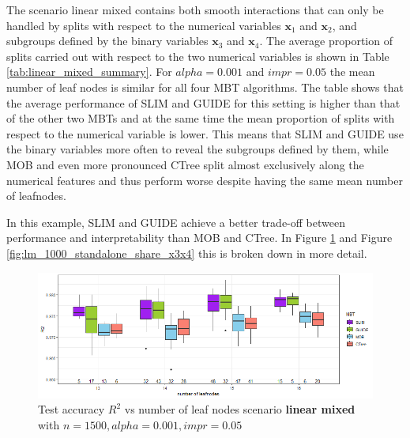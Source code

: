 The scenario linear mixed contains both smooth interactions that can only be handled by splits with respect to the numerical variables $\textbf{x}_1$ and $\textbf{x}_2$, and subgroups defined by the binary variables $\textbf{x}_3$ and $\textbf{x}_4$. 
The average proportion of splits carried out with respect to the two numerical variables is shown in Table \ref{tab:linear_mixed_summary}.
For $alpha = 0.001$ and $impr = 0.05$ the mean number of leaf nodes is similar for all four MBT algorithms. The table shows that the average performance of SLIM and GUIDE for this setting is higher than that of the other two MBTs and at the same time the mean proportion of splits with respect to the numerical variable is lower.  This means that SLIM and GUIDE use the binary variables more often to reveal the subgroups defined by them, while MOB and even more pronounced CTree split almost exclusively along the numerical features and thus perform worse despite having the same mean number of leafnodes. 

In this example, SLIM and GUIDE achieve a better trade-off between performance and interpretability than MOB and CTree.
In Figure \ref{fig:lm_1000_standalone_r2_test}  and Figure \ref{fig:lm_1000_standalone_share_x3x4} this is broken down in more detail.


\begin{figure}[!htb]
\centering
    \includegraphics[width=14cm]{Figures/simulations/batchtools/basic_scenarios/linear_mixed/lm_1000_standalone_r2_test.png}
    \caption{Test accuracy $R^2$ vs number of leaf nodes scenario
\textbf{linear mixed} with $n=1500, alpha = 0.001, impr = 0.05$}
    \label{fig:lm_1000_standalone_r2_test}

\end{figure} 


